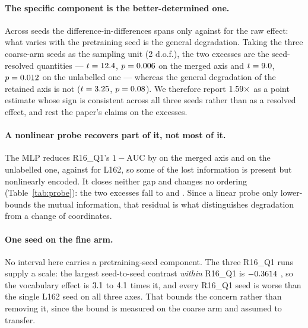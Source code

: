 \documentclass{article}
\begin{document}
\paragraph{The specific component is the better-determined one.} Across seeds
the difference-in-differences spans only \didRange{} against \rawRange{} for the
raw effect: what varies with the pretraining seed is the general degradation.
Taking the three coarse-arm seeds as the sampling unit (2 d.o.f.), the two
excesses are the seed-resolved quantities --- $t=12.4$, $p=0.006$ on
the merged axis and $t=9.0$, $p=0.012$ on the unlabelled one --- whereas
the general degradation of the retained axis is not ($t=3.25$, $p=0.08$). We
therefore report $1.59\times$ as a point estimate whose sign is consistent
across all three seeds rather than as a resolved effect, and rest the paper's
claims on the excesses.

\paragraph{A nonlinear probe recovers part of it, not most of it.} The MLP
reduces R16\_Q1's $1-\mathrm{AUC}$ by \mlpRecovery{} on the merged axis and
\mlpRecoveryQcd{} on the unlabelled one, against \mlpRecoveryL{} for L162, so
some of the lost information is present but nonlinearly encoded. It closes
neither gap and changes no ordering (Table~\ref{tab:probe}): the two excesses
fall to \didMlpMean{} and \didMlpQcd{}. Since a linear probe only lower-bounds
the mutual information, that residual is what distinguishes degradation from a
change of coordinates.

\paragraph{One seed on the fine arm.} No interval here carries a
pretraining-seed component. The three R16\_Q1 runs supply a scale: the largest
seed-to-seed contrast \emph{within} R16\_Q1 is $-0.3614$ \seedABCI, so the
vocabulary effect is $3.1$ to $4.1$ times it, and every
R16\_Q1 seed is worse than the single L162 seed on all three axes. That bounds
the concern rather than removing it, since the bound is measured on the coarse
arm and assumed to transfer.
\end{document}
